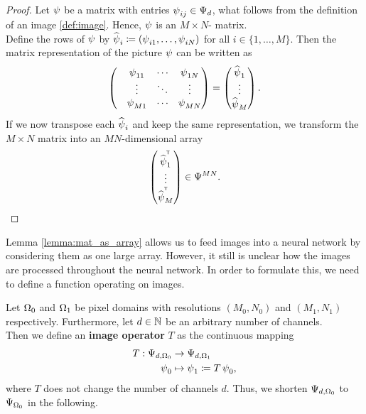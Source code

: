 \begin{proof}
Let $\operatorname{\psi}$ be a matrix with entries $\operatorname{\psi}_{ij}\in\Psi_d$, what follows from the definition of an image \ref{def:image}. Hence, $\operatorname{\psi}$ is an $M\times N$- matrix.\\
Define the rows of $\operatorname{\psi}$ by $\widehat{\operatorname{\psi}}_i\coloneqq (\operatorname{\psi}_{i1},\ldots,\operatorname{\psi}_{iN})$ for all $i\in \{1,\ldots,M\}$. Then the matrix representation of the picture $\operatorname{\psi}$ can be written as
\begin{align*}
\begin{pmatrix}
&\operatorname{\psi}_{11} &\cdots &\operatorname{\psi}_{1N}\\
&\vdots  &\ddots		 &\vdots\\
&\operatorname{\psi}_{M1} &\cdots &\operatorname{\psi}_{MN}
\end{pmatrix}=
\begin{pmatrix}
\widehat{\operatorname{\psi}}_1\\
\vdots\\
\widehat{\operatorname{\psi}}_M
\end{pmatrix}.
\end{align*}
If we now transpose each $\widehat{\operatorname{\psi}}_i$ and keep the same representation, we transform the $M\times N$ matrix into an $MN$-dimensional array
\begin{align*}
 \begin{pmatrix}
\widehat{\operatorname{\psi}}^{^{\mkern-1.5mu\mathsf{T}}}_1\\
\vdots\\
\widehat{\operatorname{\psi}}^{^{\mkern-1.5mu\mathsf{T}}}_M
\end{pmatrix} \in \Psi^{MN}.
\end{align*}
\end{proof}

Lemma \ref{lemma:mat_as_array} allows us to feed images into a neural network by considering them as one large array. However, it still is unclear how the images are processed throughout the neural network. In order to formulate this, we need to define a function operating on images.

\begin{definition}\label{def:img_operator}
Let $\Omega_0$ and $\Omega_1$ be pixel domains with resolutions $(M_0,N_0)$ and $(M_1,N_1)$ respectively. Furthermore, let $d\in\operatorname{\mathbb{N}}$ be an arbitrary number of channels.\\
Then we define an \textbf{image operator} $T$ as the continuous mapping
\begin{align*}
T: \Psi_{d,\Omega_0} &\to \Psi_{d,\Omega_1}\\
\operatorname{\psi}_0 &\mapsto \operatorname{\psi}_1 \coloneqq T \operatorname{\psi}_0,
\end{align*}
where $T$ does not change the number of channels $d$. Thus, we shorten $\Psi_{d,\Omega_0}$ to $\Psi_{\Omega_0}$ in the following.
\end{definition}

